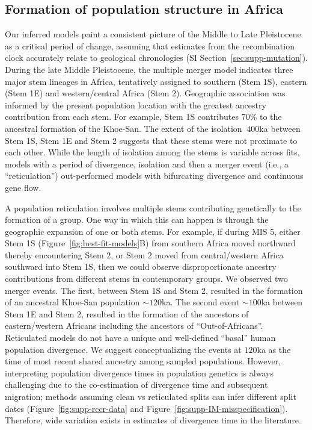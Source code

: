 \documentclass[]{article}
\begin{document}
\subsection*{Formation of population structure in Africa}

Our inferred models paint a consistent picture of the Middle to Late
Pleistocene as a critical period of change, assuming that estimates from the
recombination clock accurately relate to geological chronologies (SI
Section~\ref{sec:supp-mutation}). During the late Middle Pleistocene, the
multiple merger model indicates three major stem lineages in Africa,
tentatively assigned to southern (Stem 1S), eastern (Stem 1E) and
western/central Africa (Stem 2). Geographic association was informed by the
present population location with the greatest ancestry contribution from each
stem. For example, Stem 1S contributes 70\% to the ancestral formation of the
Khoe-San. The extent of the isolation $\>400$ka between Stem 1S, Stem 1E and
Stem 2 suggests that these stems were not proximate to each other. While the
length of isolation among the stems is variable across fits, models with a
period of divergence, isolation and then a merger event (i.e., a
``reticulation'') out-performed models with bifurcating divergence and
continuous gene flow. 

A population reticulation involves multiple stems contributing genetically to
the formation of a group. One way in which this can happen is through the
geographic expansion of one or both stems. For example, if during MIS 5, either
Stem 1S (Figure~\ref{fig:best-fit-models}B) from southern Africa moved
northward thereby encountering Stem 2, or Stem 2 moved from central/western
Africa southward into Stem 1S, then we could observe disproportionate ancestry
contributions from different stems in contemporary groups. We observed two
merger events. The first, between Stem 1S and Stem 2, resulted in the formation
of an ancestral Khoe-San population $\sim120$ka. The second event $\sim100$ka
between Stem 1E and Stem 2, resulted in the formation of the ancestors of
eastern/western Africans including the ancestors of ``Out-of-Africans''.
Reticulated models do not have a unique and well-defined ``basal'' human
population divergence.  We suggest conceptualizing the events at $120$ka as the
time of most recent shared ancestry among sampled populations. However,
interpreting population divergence times in population genetics is always
challenging due to the co-estimation of divergence time and subsequent
migration; methods assuming clean vs reticulated splits can infer different
split dates (Figure~\ref{fig:supp-rccr-data} and
Figure~\ref{fig:supp-IM-misspecification}). Therefore, wide variation exists in
estimates of divergence time in the
literature\citep{Bergstrom2021-iw,Henn2018-rf}.
\end{document}
